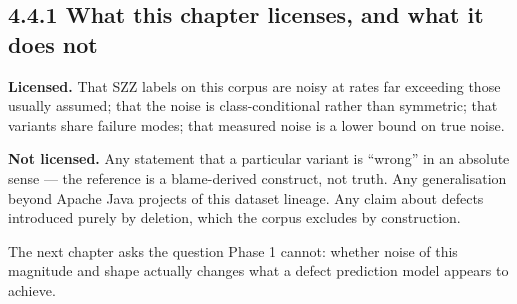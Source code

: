 \subsection{4.4.1 What this chapter licenses, and what it does
not}\label{what-this-chapter-licenses-and-what-it-does-not}

\textbf{Licensed.} That SZZ labels on this corpus are noisy at rates far
exceeding those usually assumed; that the noise is class-conditional
rather than symmetric; that variants share failure modes; that measured
noise is a lower bound on true noise.

\textbf{Not licensed.} Any statement that a particular variant is
``wrong'' in an absolute sense --- the reference is a blame-derived
construct, not truth. Any generalisation beyond Apache Java projects of
this dataset lineage. Any claim about defects introduced purely by
deletion, which the corpus excludes by construction.

The next chapter asks the question Phase 1 cannot: whether noise of this
magnitude and shape actually changes what a defect prediction model
appears to achieve.

